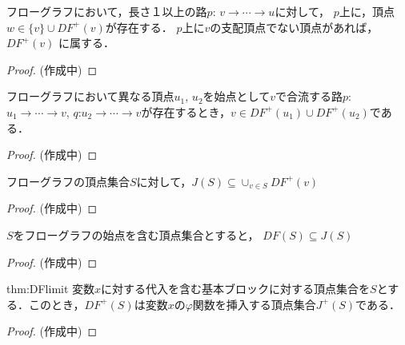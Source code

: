 \documentclass[dvipdfmx,a4j]{jbook}
\begin{document}
\begin{Lem}
    フローグラフにおいて，長さ１以上の路$p$: $v\rightarrow\cdots\rightarrow u$に対して，
    $p$上に，頂点$w\in\{v\}\cup DF^+(v)$が存在する．
    $p$上に$v$の支配頂点でない頂点があれば，$DF^+(v)$
    に属する．
\end{Lem}
\begin{proof}
    (作成中)
\end{proof}

\begin{Lem}
    フローグラフにおいて異なる頂点$u_1$, $u_2$を始点として$v$で合流する路$p$:$u_1\rightarrow\cdots\rightarrow v$, $q$:$u_2\rightarrow\cdots\rightarrow v$が存在するとき，$v\in DF^+(u_1)\cup DF^+(u_2)$である．
\end{Lem}
\begin{proof}
    (作成中)
\end{proof}

\begin{Lem}
    フローグラフの頂点集合$S$に対して，$J(S)\subseteq\cup_{v\in S}DF^+(v)$
\end{Lem}
\begin{proof}
    (作成中)
\end{proof}

\begin{Lem}
    $S$をフローグラフの始点を含む頂点集合とすると，
    $DF(S)\subseteq J(S)$
\end{Lem}
\begin{proof}
    (作成中)
\end{proof}

\begin{repThm}{thm:DFlimit}
    変数$x$に対する代入を含む基本ブロックに対する頂点集合を$S$とする．このとき，$DF^+(S)$は変数$x$の$\varphi$関数を挿入する頂点集合$J^+(S)$である．
\end{repThm}

\begin{proof}
    (作成中)
\end{proof}
\end{document}
